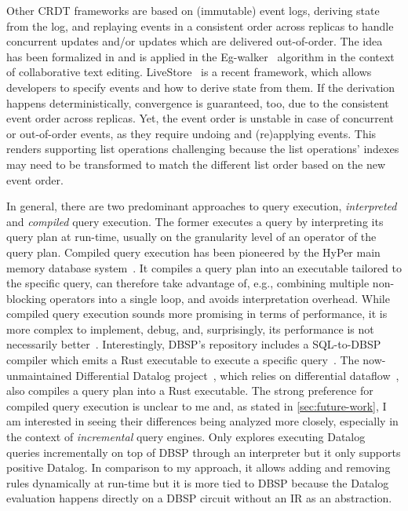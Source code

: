 Other \ac{CRDT} frameworks are based on (immutable) event logs, deriving state
from the log, and replaying events in a consistent order across replicas to
handle concurrent updates and/or updates which are delivered out-of-order.
The idea has been formalized in \cite{baquero2017pure} and is applied in
the Eg-walker~\cite{egwalker} algorithm in the context of collaborative text
editing.
LiveStore~\cite{livestore} is a recent framework, which allows developers
to specify events and how to derive state from them.
If the derivation happens deterministically, convergence is guaranteed, too,
due to the consistent event order across replicas.
Yet, the event order is unstable in case of concurrent or out-of-order events,
as they require undoing and (re)applying events.
This renders supporting list operations challenging because the list operations'
indexes may need to be transformed to match the different list order based on
the new event order.

In general, there are two predominant approaches to query execution,
\emph{interpreted} and \emph{compiled} query execution.
The former executes a query by interpreting its query plan at run-time,
usually on the granularity level of an operator of the query plan.
Compiled query execution has been pioneered by the HyPer main memory database
system~\cite{neumann2011efficiently}.
It compiles a query plan into an executable tailored to the specific query,
can therefore take advantage of, e.g., combining multiple non-blocking operators
into a single loop, and avoids interpretation overhead.
While compiled query execution sounds more promising in terms of performance,
it is more complex to implement, debug, and, surprisingly, its performance
is not necessarily better~\cite{kersten2018everything}.
Interestingly, DBSP's repository includes a SQL-to-DBSP compiler which emits
a Rust executable to execute a specific query~\cite{felderarepo}.
The now-unmaintained Differential Datalog project~\cite{ddlog, ddlogpaper},
which relies on differential dataflow~\cite{mcsherry2013differential},
also compiles a query plan into a Rust executable.
The strong preference for compiled query execution is unclear to me and,
as stated in \ref{sec:future-work}, I am interested in seeing their differences
being analyzed more closely, especially in the context of \emph{incremental}
query engines.
Only \cite{dynamicdatalog} explores executing Datalog queries incrementally
on top of DBSP through an interpreter but it only supports positive Datalog.
In comparison to my approach, it allows adding and removing rules dynamically
at run-time but it is more tied to DBSP because the Datalog evaluation happens
directly on a DBSP circuit without an \ac{IR} as an abstraction.

